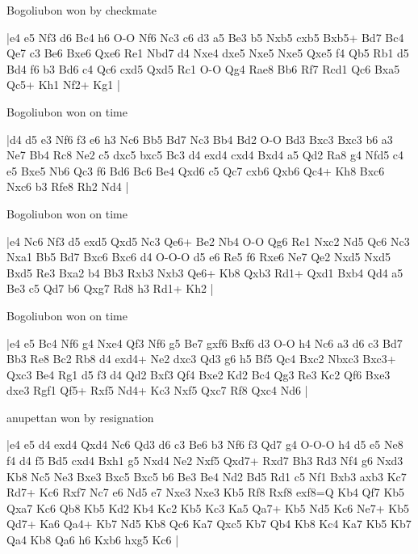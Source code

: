 \showboard

Bogoliubon won by checkmate

\makegametitle
|e4 e5 Nf3 d6 Bc4 h6 O-O Nf6 Nc3 c6 d3 a5 Be3 b5 Nxb5 cxb5 Bxb5+ Bd7 Bc4 Qe7 c3 Be6 Bxe6 Qxe6 Re1 Nbd7 d4 Nxe4 dxe5 Nxe5 Nxe5 Qxe5 f4 Qb5 Rb1 d5 Bd4 f6 b3 Bd6 c4 Qc6 cxd5 Qxd5 Rc1 O-O Qg4 Rae8 Bb6 Rf7 Rcd1 Qc6 Bxa5 Qc5+ Kh1 Nf2+ Kg1  |

\showboard

Bogoliubon won on time

\makegametitle
|d4 d5 e3 Nf6 f3 e6 h3 Nc6 Bb5 Bd7 Nc3 Bb4 Bd2 O-O Bd3 Bxc3 Bxc3 b6 a3 Ne7 Bb4 Rc8 Ne2 c5 dxc5 bxc5 Bc3 d4 exd4 cxd4 Bxd4 a5 Qd2 Ra8 g4 Nfd5 c4 e5 Bxe5 Nb6 Qc3 f6 Bd6 Bc6 Be4 Qxd6 c5 Qc7 cxb6 Qxb6 Qc4+ Kh8 Bxc6 Nxc6 b3 Rfe8 Rh2 Nd4  |

\showboard

Bogoliubon won on time

\makegametitle
|e4 Nc6 Nf3 d5 exd5 Qxd5 Nc3 Qe6+ Be2 Nb4 O-O Qg6 Re1 Nxc2 Nd5 Qc6 Nc3 Nxa1 Bb5 Bd7 Bxc6 Bxc6 d4 O-O-O d5 e6 Re5 f6 Rxe6 Ne7 Qe2 Nxd5 Nxd5 Bxd5 Re3 Bxa2 b4 Bb3 Rxb3 Nxb3 Qe6+ Kb8 Qxb3 Rd1+ Qxd1 Bxb4 Qd4 a5 Be3 c5 Qd7 b6 Qxg7 Rd8 h3 Rd1+ Kh2  |

\showboard

Bogoliubon won on time

\makegametitle
|e4 e5 Bc4 Nf6 g4 Nxe4 Qf3 Nf6 g5 Be7 gxf6 Bxf6 d3 O-O h4 Nc6 a3 d6 c3 Bd7 Bb3 Re8 Bc2 Rb8 d4 exd4+ Ne2 dxc3 Qd3 g6 h5 Bf5 Qc4 Bxc2 Nbxc3 Bxc3+ Qxc3 Be4 Rg1 d5 f3 d4 Qd2 Bxf3 Qf4 Bxe2 Kd2 Bc4 Qg3 Re3 Kc2 Qf6 Bxe3 dxe3 Rgf1 Qf5+ Rxf5 Nd4+ Kc3 Nxf5 Qxc7 Rf8 Qxc4 Nd6  |

\showboard

anupettan won by resignation

\makegametitle
|e4 e5 d4 exd4 Qxd4 Nc6 Qd3 d6 c3 Be6 b3 Nf6 f3 Qd7 g4 O-O-O h4 d5 e5 Ne8 f4 d4 f5 Bd5 cxd4 Bxh1 g5 Nxd4 Ne2 Nxf5 Qxd7+ Rxd7 Bh3 Rd3 Nf4 g6 Nxd3 Kb8 Nc5 Ne3 Bxe3 Bxc5 Bxc5 b6 Be3 Be4 Nd2 Bd5 Rd1 c5 Nf1 Bxb3 axb3 Kc7 Rd7+ Kc6 Rxf7 Nc7 e6 Nd5 e7 Nxe3 Nxe3 Kb5 Rf8 Rxf8 exf8=Q Kb4 Qf7 Kb5 Qxa7 Kc6 Qb8 Kb5 Kd2 Kb4 Kc2 Kb5 Kc3 Ka5 Qa7+ Kb5 Nd5 Kc6 Ne7+ Kb5 Qd7+ Ka6 Qa4+ Kb7 Nd5 Kb8 Qc6 Ka7 Qxc5 Kb7 Qb4 Kb8 Kc4 Ka7 Kb5 Kb7 Qa4 Kb8 Qa6 h6 Kxb6 hxg5 Kc6  |

